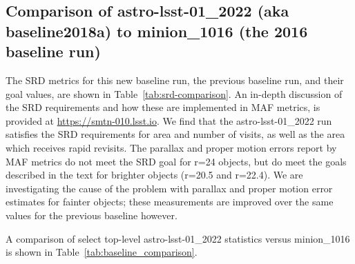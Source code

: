 \documentclass[DM,authoryear,toc]{lsstdoc}
\begin{document}
\subsection{Comparison of astro-lsst-01\_2022 (aka baseline2018a) to minion\_1016 (the 2016 baseline run)}

The SRD metrics for this new baseline run, the previous baseline run, and their goal values, are shown in Table~\ref{tab:srd-comparison}. An in-depth discussion of the SRD requirements and how these are implemented in MAF metrics, is provided at \url{https://smtn-010.lsst.io}. We find that the astro-lsst-01\_2022 run satisfies the SRD requirements for area and number of visits, as well as the area which receives rapid revisits.  The parallax and proper motion errors report by MAF metrics do not meet the SRD goal for r=24 objects, but do meet the goals described in the text for brighter objects (r=20.5 and r=22.4). We are investigating the cause of the problem with parallax and proper motion error estimates for fainter objects; these measurements are improved over the same values for the previous baseline however.

A comparison of select top-level astro-lsst-01\_2022 statistics versus minion\_1016 is shown in Table~\ref{tab:baseline_comparison}. 
\end{document}
